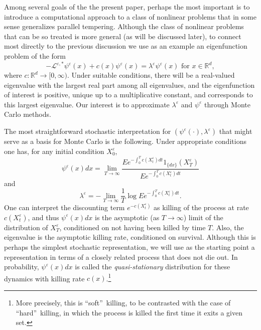 \documentclass[english,11pt]{article}%
\numberwithin{equation}{section}
\numberwithin{example}{section}
\numberwithin{theorem}{section}
\begin{document}
Among several goals of the the present paper, perhaps the most important is to
introduce a computational approach to a class of nonlinear problems that in
some sense generalizes parallel tempering. Although the class of nonlinear
problems that can be so treated is more general (as will be discussed later),
to connect most directly to the previous discussion we use as an example an
eigenfunction problem of the form%
\begin{equation}
-\mathcal{L}^{\varepsilon,\ast}\psi^{\varepsilon}(x)+c(x)\psi^{\varepsilon
}(x)=\lambda^{\varepsilon}\psi^{\varepsilon}(x)\text{ for }x\in\mathbb{R}^{d},
\label{eqn:QSD}%
\end{equation}
where $c:\mathbb{R}^{d}\rightarrow\lbrack0,\infty)$. Under suitable conditions, there will be a real-valued eigenvalue with the largest real part
among all eigenvalues, and the eigenfunction of interest is positive, unique
up to a multiplicative constant, and corresponds to this largest eigenvalue.
Our interest is to approximate $\lambda^{\varepsilon}$ and $\psi^{\varepsilon
}$ through Monte Carlo methods. 

The most straightforward stochastic interpretation for $(\psi^{\varepsilon
}(\cdot),\lambda^{\varepsilon})$ that might serve as a basis for Monte Carlo
is the following. Under appropriate conditions one has, for any initial
condition $X_{0}^{\varepsilon}$,
\begin{equation}
\psi^{\varepsilon}(x)dx=\lim_{T\rightarrow\infty}\frac{Ee^{-\int_{0}%
^{T}c(X_{t}^{\varepsilon})dt}1_{\{dx\}}(X_{T}^{\varepsilon})}{Ee^{-\int
_{0}^{T}c(X_{t}^{\varepsilon})dt}} \label{eqn:largeT}%
\end{equation}
and
\[
\lambda^{\varepsilon}=-\lim_{T\rightarrow\infty}\frac{1}{T}\log Ee^{-\int
_{0}^{T}c(X_{t}^{\varepsilon})dt}.
\]
One can interpret the discounting term $e^{-c(X_{t}^{\varepsilon})}$ as
killing of the process at rate $c(X_{t}^{\varepsilon})$, and thus
$\psi^{\varepsilon}(x)dx$ is the asymptotic (as $T\rightarrow\infty$) limit of
the distribution of $X_{T}^{\varepsilon}$, conditioned on not having been
killed by time $T$. Also, the eigenvalue is the asymptotic killing rate,
conditioned on survival. Although this is perhaps the simplest stochastic
representation, we will use as the starting point a representation in terms of
a closely related process that does not die out. In probability,
$\psi^{\varepsilon}(x)dx$ is called the \emph{quasi-stationary} distribution for
these dynamics with killing rate $c(x)$.\footnote{More precisely, this is
\textquotedblleft soft\textquotedblright\ killing, to be contrasted with the
case of \textquotedblleft hard\textquotedblright\ killing, in which the
process is killed the first time it exits a given set.}
\end{document}
